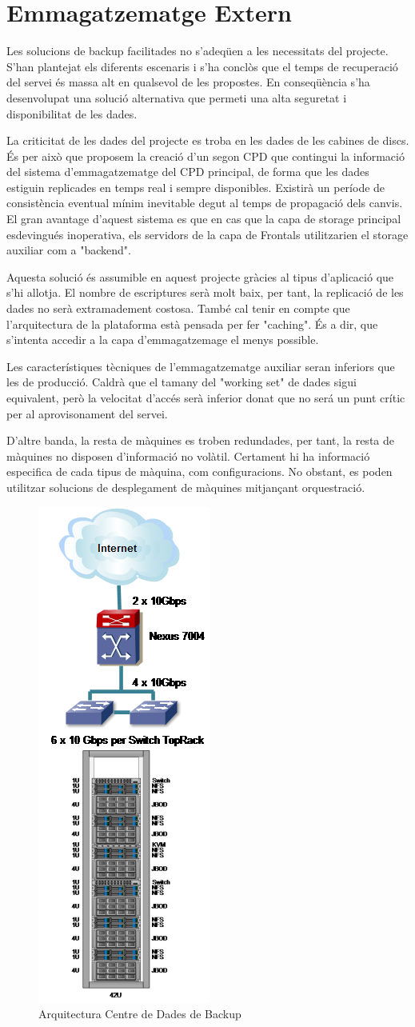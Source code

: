 \section{Emmagatzematge Extern}

Les solucions de backup facilitades no s'adeqüen a les necessitats del projecte. S'han plantejat els diferents escenaris i s'ha conclòs que el temps de recuperació del servei és massa alt en qualsevol de les propostes. En conseqüència s'ha desenvolupat una solució alternativa que permeti una alta seguretat i disponibilitat de les dades. 

La criticitat de les dades del projecte es troba en les dades de les cabines de discs. És per això que proposem la creació d'un segon CPD que contingui la informació del sistema d'emmagatzematge del CPD principal, de forma que les dades estiguin replicades en temps real i sempre disponibles. Existirà un període de consistència eventual mínim inevitable degut al temps de propagació dels canvis. El gran avantage d'aquest sistema es que en cas que la capa de storage principal esdevingués inoperativa, els servidors de la capa de Frontals utilitzarien el storage auxiliar com a "backend".

Aquesta solució és assumible en aquest projecte gràcies al tipus d'aplicació que s'hi allotja. El nombre de escriptures serà molt baix, per tant, la replicació de les dades no serà extramadement costosa. També cal tenir en compte que l'arquitectura de la plataforma està pensada per fer "caching". És a dir, que s'intenta accedir a la capa d'emmagatzemage el menys possible. 

Les característiques tècniques de l'emmagatzematge auxiliar seran inferiors que les de producció. Caldrà que el tamany del "working set" de dades sigui equivalent, però la velocitat d'accés serà inferior donat que no será un punt crític per al aprovisonament del servei. 

D'altre banda, la resta de màquines es troben redundades, per tant, la resta de màquines no disposen d'informació no volàtil. Certament hi ha informació especifica de cada tipus de màquina, com configuracions. No obstant, es poden utilitzar solucions de desplegament de màquines mitjançant orquestració.

\begin{figure}[H]
    \centering
    \includegraphics[height=0.55\textwidth]{cpdbackupnetwork}
    \caption{Arquitectura Centre de Dades de Backup \label{fig:CPDbackup}}    
\end{figure}

